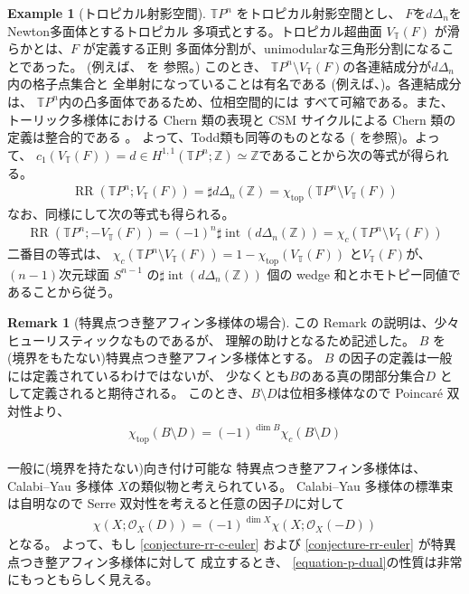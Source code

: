\documentclass[a4paper,dvipdfmx,reqno,12pt]{amsart}
\theoremstyle{definition}
\newtheorem{example}[theorem]{Example}
\newtheorem{remark}[theorem]{Remark}
\newcommand{\opn}[1]{\operatorname{#1}}
\numberwithin{equation}{section}
\begin{document}
\begin{example}[{トロピカル射影空間}]

$\mathbb{T}P^{n}$ をトロピカル射影空間とし、
$F$を$d\Delta_{n}$をNewton多面体とするトロピカル
多項式とする。トロピカル超曲面 
$V_{\mathbb{T}}(F)$ が滑らかとは、$F$ が定義する正則
多面体分割が、unimodularな三角形分割になることであった。
(例えば、\cite[]{MR3287221} を
参照。)
このとき、
$\mathbb{T}P^{n}\setminus
V_{\mathbb{T}}(F)$の各連結成分が$d\Delta_n$内の格子点集合と
全単射になっていることは有名である
(例えば、\cite[Proposition 3.1.6]{MR3287221})。各連結成分は、
$\mathbb{T}P^{n}$内の凸多面体であるため、位相空間的には
すべて可縮である。また、
トーリック多様体における Chern 類の表現と
CSM サイクルによる Chern 類の定義は整合的である
\cite[Proposition 13.1.2]{MR2810322}。
よって、Todd類も同等のものとなる
(\cite[Theorem 13.1.6]{MR2810322} を参照)。よって、
$c_1(V_{\mathbb{T}}(F))=d\in H^{1,1}(\mathbb{T}P^{n};
\mathbb{Z})
\simeq \mathbb{Z}$であることから次の等式が得られる。
\begin{align}
\opn{RR}(\mathbb{T}P^{n};V_{\mathbb{T}}(F))=
\sharp d\Delta_n(\mathbb{Z})=
\chi_{\mathrm{top}}(\mathbb{T}P^{n}\setminus
V_{\mathbb{T}}(F))
\end{align}
なお、同様にして次の等式も得られる。
\begin{align}
\opn{RR}(\mathbb{T}P^{n};-V_{\mathbb{T}}(F))=
(-1)^{n}\sharp \opn{int}(d\Delta_n(\mathbb{Z}))=
\chi_{c}(\mathbb{T}P^{n}\setminus
V_{\mathbb{T}}(F))   
\end{align}
二番目の等式は、
$\chi_{c}(\mathbb{T}P^{n}\setminus
V_{\mathbb{T}}(F))=1-\chi_{\opn{top}}(V_{\mathbb{T}}(F))$
と$V_{\mathbb{T}}(F)$が、$(n-1)$次元球面
$S^{n-1}$ 
の$\sharp \opn{int}(d\Delta_n(\mathbb{Z}))$
個の wedge 和とホモトピー同値であることから従う。
\end{example}

\begin{remark}[{特異点つき整アフィン多様体の場合}]
この Remark の説明は、少々ヒューリスティックなものであるが、
理解の助けとなるため記述した。
$B$ を(境界をもたない)特異点つき整アフィン多様体とする。
$B$ の因子の定義は一般には定義されているわけではないが、
少なくとも$B$のある真の閉部分集合$D$
として定義されると期待される。
このとき、$B\setminus D$は位相多様体なので
Poincar\'e 双対性より、
\begin{align}
\label{equation-p-dual}
\chi_{\mathrm{top}}(B\setminus D)=(-1)^{\dim B}
\chi_c(B\setminus D)
\end{align}

一般に(境界を持たない)向き付け可能な
特異点つき整アフィン多様体は、Calabi--Yau 多様体
$X$の類似物と考えられている。
Calabi--Yau 多様体の標準束は自明なので
Serre 双対性を考えると任意の因子$D$に対して
\begin{align}
\chi(X;\mathcal{O}_X(D))=(-1)^{\dim X}
\chi(X;\mathcal{O}_{X}(-D))
\end{align}
となる。
よって、もし \cref{conjecture-rr-c-euler}
および \cref{conjecture-rr-euler} が特異点つき整アフィン多様体に対して
成立するとき、
\cref{equation-p-dual}の性質は非常にもっともらしく見える。
\end{remark}
\end{document}

